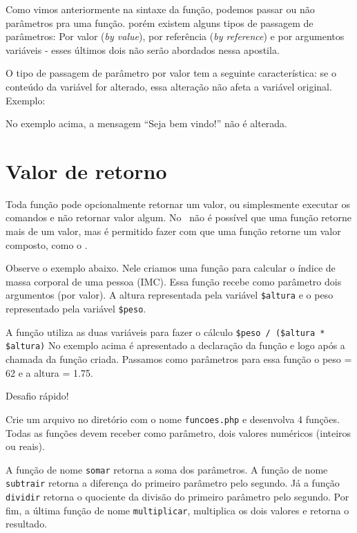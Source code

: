 Como vimos anteriormente na sintaxe da função, podemos passar ou não parâmetros pra uma função. 
porém existem alguns tipos de passagem de parâmetros: Por valor (\textit{by value}), por 
referência (\textit{by reference}) e por argumentos variáveis - esses últimos dois não 
serão abordados nessa apostila.

O tipo de passagem de parâmetro por valor tem a seguinte característica: se o conteúdo da 
variável for alterado, essa alteração não afeta a variável original. Exemplo:



No exemplo acima, a mensagem ``Seja bem vindo!'' não é alterada.

\section{Valor de retorno}
\label{valor-de-retorno}

Toda função pode opcionalmente retornar um valor, ou simplesmente executar os comandos 
e não retornar valor algum. No \php~não é possível que uma função retorne mais de um valor, 
mas é permitido fazer com que uma função retorne um valor composto, como o \tipoarray. 

Observe o exemplo abaixo. Nele criamos uma função para calcular o índice de massa 
corporal de uma pessoa (IMC). Essa função recebe como parâmetro dois argumentos (por valor). 
A altura representada pela variável \texttt{\$altura} e o peso representado pela 
variável \texttt{\$peso}. 



A função utiliza as duas variáveis para fazer o cálculo \texttt{\$peso / (\$altura * \$altura)}
No exemplo acima é apresentado a declaração da função e logo após a chamada
da função criada. Passamos como parâmetros para essa função o peso = 62 e a 
altura = 1.75. 

\begin{framed}
{\Large Desafio rápido!}

Crie um arquivo no diretório  com o nome \texttt{funcoes.php}
e desenvolva 4 funções. Todas as funções devem receber como parâmetro, dois valores numéricos
(inteiros ou reais). 

A função de nome \texttt{somar} retorna a soma dos parâmetros. A função
de nome \texttt{subtrair} retorna a diferença do primeiro parâmetro pelo segundo.
Já a função \texttt{dividir} retorna o quociente da divisão do primeiro parâmetro pelo segundo.
Por fim, a última função de nome \texttt{multiplicar}, multiplica os dois valores e retorna
o resultado.
\end{framed}

